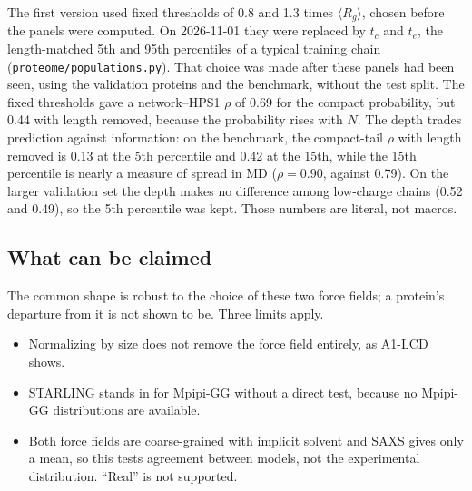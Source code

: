 \documentclass[11pt]{article}
\newcommand{\mRg}{\langle R_g\rangle}
\begin{document}
The first version used fixed thresholds of 0.8 and 1.3 times $\mRg$, chosen before the panels were computed. On 2026-11-01 they were replaced by $t_c$ and $t_e$, the length-matched 5th and 95th percentiles of a typical training chain (\texttt{proteome/populations.py}). That choice was made after these panels had been seen, using the validation proteins and the benchmark, without the test split. The fixed thresholds gave a network--HPS1 $\rho$ of 0.69 for the compact probability, but 0.44 with length removed, because the probability rises with $N$. The depth trades prediction against information: on the benchmark, the compact-tail $\rho$ with length removed is 0.13 at the 5th percentile and 0.42 at the 15th, while the 15th percentile is nearly a measure of spread in MD ($\rho=0.90$, against 0.79). On the larger validation set the depth makes no difference among low-charge chains (0.52 and 0.49), so the 5th percentile was kept. Those numbers are literal, not macros.

\subsection{What can be claimed}
The common shape is robust to the choice of these two force fields; a protein's departure from it is not shown to be. Three limits apply.
\begin{itemize}
\item Normalizing by size does not remove the force field entirely, as A1-LCD shows.
\item STARLING stands in for Mpipi-GG without a direct test, because no Mpipi-GG distributions are available.
\item Both force fields are coarse-grained with implicit solvent and SAXS gives only a mean, so this tests agreement between models, not the experimental distribution. ``Real'' is not supported.
\end{itemize}

\end{document}
